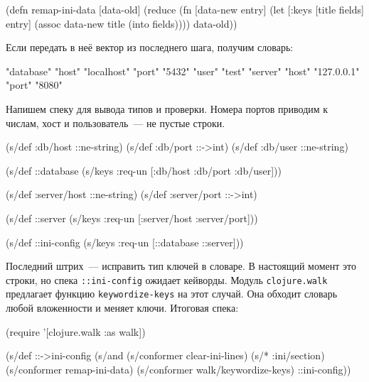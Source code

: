 \begin{english}
  \begin{clojure}
(defn remap-ini-data [data-old]
  (reduce
   (fn [data-new entry]
     (let [{:keys [title fields]} entry]
       (assoc data-new title (into {} fields))))
   {}
   data-old))
  \end{clojure}
\end{english}

\noindent
Если передать в неё вектор из последнего шага, получим словарь:

\begin{english}
  \begin{clojure}
{"database" {"host" "localhost" "port" "5432" "user" "test"}
 "server" {"host" "127.0.0.1" "port" "8080"}}
  \end{clojure}
\end{english}

Напишем спеку для вывода типов и проверки. Номера портов приводим к числам, хост
и пользователь~--- не пустые строки.

\begin{english}
  \begin{clojure}
(s/def :db/host ::ne-string)
(s/def :db/port ::->int)
(s/def :db/user ::ne-string)

(s/def ::database
  (s/keys :req-un [:db/host :db/port :db/user]))

(s/def :server/host ::ne-string)
(s/def :server/port ::->int)

(s/def ::server
  (s/keys :req-un [:server/host :server/port]))

(s/def ::ini-config
  (s/keys :req-un [::database ::server]))
  \end{clojure}
\end{english}


Последний штрих~--- исправить тип ключей в словаре. В настоящий момент это
строки, но спека \verb|::ini-config| ожидает кейворды. Модуль
\verb|clojure.walk| предлагает функцию \verb|keywordize-keys| на этот
случай. Она обходит словарь любой вложенности и меняет ключи. Итоговая спека:

\begin{english}
  \begin{clojure}
(require '[clojure.walk :as walk])

(s/def ::->ini-config
  (s/and
   (s/conformer clear-ini-lines)
   (s/* :ini/section)
   (s/conformer remap-ini-data)
   (s/conformer walk/keywordize-keys)
   ::ini-config))
  \end{clojure}
\end{english}

